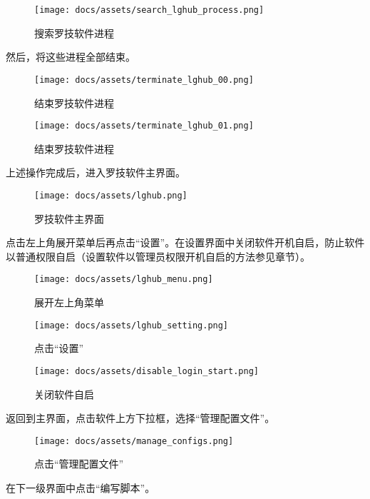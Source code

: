\begin{figure}[H]
    \Centering
    \texttt{[image: docs/assets/search\_lghub\_process.png]}
    \caption{搜索罗技软件进程}
\end{figure}

然后，将这些进程全部结束。

\begin{figure}[H]
    \Centering
    \texttt{[image: docs/assets/terminate\_lghub\_00.png]}
    \caption{结束罗技软件进程}
\end{figure}

\begin{figure}[H]
    \Centering
    \texttt{[image: docs/assets/terminate\_lghub\_01.png]}
    \caption{结束罗技软件进程}
\end{figure}

上述操作完成后，进入罗技软件主界面。

\begin{figure}[H]
    \Centering
    \texttt{[image: docs/assets/lghub.png]}
    \caption{罗技软件主界面}
\end{figure}

点击左上角展开菜单后再点击“设置”。在设置界面中关闭软件开机自启，防止软件以普通权限自启（设置软件以管理员权限开机自启的方法参见章节）。

\begin{figure}[H]
    \Centering
    \texttt{[image: docs/assets/lghub\_menu.png]}
    \caption{展开左上角菜单}
\end{figure}

\begin{figure}[H]
    \Centering
    \texttt{[image: docs/assets/lghub\_setting.png]}
    \caption{点击“设置”}
\end{figure}

\begin{figure}[H]
    \Centering
    \texttt{[image: docs/assets/disable\_login\_start.png]}
    \caption{关闭软件自启}
\end{figure}

返回到主界面，点击软件上方下拉框，选择“管理配置文件”。

\begin{figure}[H]
    \Centering
    \texttt{[image: docs/assets/manage\_configs.png]}
    \caption{点击“管理配置文件”}
\end{figure}

在下一级界面中点击“编写脚本”。

